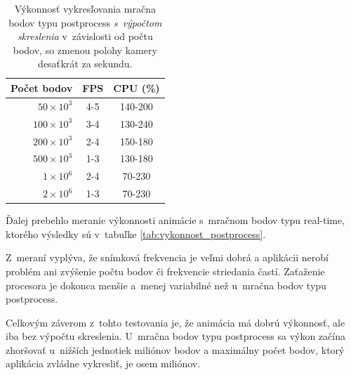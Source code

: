 \begin{table}[t]
    \centering
    \begin{tabular}{r||c|c}
        Počet bodov & FPS & CPU (\%) \\ \hline
        $50\times10^3$ & 4-5 & 140-200 \\
        $100\times10^3$ & 3-4 & 130-240 \\
        $200\times10^3$ & 2-4 & 150-180 \\
        $500\times10^3$ & 1-3 & 130-180 \\
        $1\times10^6$ & 2-4 & 70-230 \\
        $2\times10^6$ & 1-3 & 70-230 \\
    \end{tabular}
    \caption{Výkonnosť vykresľovania mračna bodov typu postprocess \emph{s~výpočtom skreslenia} v~závislosti od počtu bodov, so zmenou polohy kamery desaťkrát za sekundu.}
    \label{tab:vykonnost_postprocess_so_skreslenim}
\end{table}

Ďalej prebehlo meranie výkonnosti animácie s~mračnom bodov typu real-time, ktorého výsledky sú v~tabuľke \ref{tab:vykonnost_postprocess}.

Z~meraní vyplýva, že snímková frekvencia je veľmi dobrá a aplikácii nerobí problém ani zvýšenie počtu bodov či frekvencie striedania častí. Zaťaženie procesora je dokonca menšie a~menej variabilné než u~mračna bodov typu postprocess.

Celkovým záverom z~tohto testovania je, že animácia má dobrú výkonnosť, ale iba bez výpočtu skreslenia. U~mračna bodov typu postprocess sa výkon začína zhoršovať u~nižších jednotiek miliónov bodov a maximálny počet bodov, ktorý aplikácia zvládne vykresliť, je osem miliónov.

